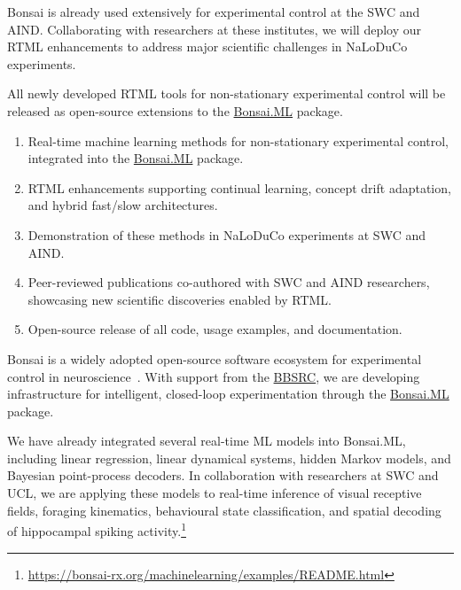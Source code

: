 Bonsai is already used extensively for experimental control at the SWC and AIND. Collaborating with researchers at these institutes, we will deploy our RTML enhancements to address major scientific challenges in NaLoDuCo experiments.

All newly developed RTML tools for non-stationary experimental control will be released as open-source extensions to the \href{https://bonsai-rx.org/machinelearning/}{Bonsai.ML} package.


\begin{enumerate}
    \item Real-time machine learning methods for non-stationary experimental control, integrated into the \href{https://bonsai-rx.org/machinelearning/}{Bonsai.ML} package.
    \item RTML enhancements supporting continual learning, concept drift adaptation, and hybrid fast/slow architectures.
    \item Demonstration of these methods in NaLoDuCo experiments at SWC and AIND.
    \item Peer-reviewed publications co-authored with SWC and AIND researchers, showcasing new scientific discoveries enabled by RTML.
    \item Open-source release of all code, usage examples, and documentation.
\end{enumerate}

\label{sec:bonsai}

Bonsai is a widely adopted open-source software ecosystem for experimental
control in neuroscience~\citep{lopesEtAl15}. With support from the
\href{https://gow.bbsrc.ukri.org/grants/AwardDetails.aspx?FundingReference=BB\%2FW019132\%2F1}{BBSRC},
we are developing infrastructure for intelligent, closed-loop experimentation
through the \href{https://bonsai-rx.org/machinelearning/}{Bonsai.ML} package.

We have already integrated several real-time ML models into Bonsai.ML,
including linear regression, linear dynamical systems, hidden Markov models,
and Bayesian point-process decoders. In collaboration with researchers at SWC
and UCL, we are applying these models to real-time inference of visual
receptive fields, foraging kinematics, behavioural state classification, and
spatial decoding of hippocampal spiking
activity.\footnote{\url{https://bonsai-rx.org/machinelearning/examples/README.html}}

